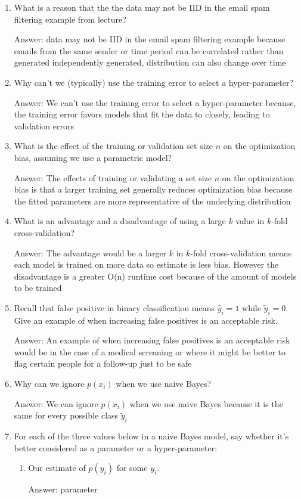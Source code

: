 \documentclass{article}
\newcommand{\gre}[1]{\textcolor{gre}{#1}}
\newcommand\ans[1]{\par\gre{Answer: #1}}
\begin{document}
    \begin{enumerate}
        \item What is a reason that the the data may not be IID in the email spam filtering example from lecture?
        \ans{data may not be IID in the email spam filtering example because emails from the same sender or time period can be correlated rather than generated independently 
        generated, distribution can also change over time}

        \item Why can't we (typically) use the training error to select a hyper-parameter?
        \ans{We can't use the training error to select a hyper-parameter because, the training error favors models that fit the data to closely, leading to 
        validation errors}

        \item What is the effect of the training or validation set size $n$ on the optimization bias, assuming we use a parametric model?
        \ans{The effects of training or validating a set size $n$ on the optimization bias is that a larger training set generally reduces optimization bias
        because the fitted parameters are more representative of the underlying distribution}

        \item What is an advantage and a disadvantage of using a large $k$ value in $k$-fold cross-validation?
        \ans{The advantage would be a larger $k$ in $k$-fold cross-validation means each model is trained on more data so estimate is less bias.
        However the disadvantage is a greater O(n) runtime cost because of the amount of models to be trained}

        \item Recall that false positive in binary classification means $\hat y_i=1$ while $\tilde y_i = 0$. Give an example of when increasing false positives is an acceptable risk.
        \ans{An example of when increasing false positives is an acceptable risk would be in the case of a medical screaning or where it might be better to flag certain people
        for a follow-up just to be safe}

        \item Why can we ignore $p(x_i)$ when we use naive Bayes?
        \ans{We can ignore $p(x_i)$ when we use naive Bayes because it is the same for every possible class  $\tilde y_i$}

        \item For each of the three values below in a naive Bayes model, say whether it's better considered as a parameter or a hyper-parameter:
        \begin{enumerate}
            \item Our estimate of $p(y_i)$ for some $y_i$.
            \ans{parameter}


\end{enumerate}
\end{enumerate}
\end{document}
